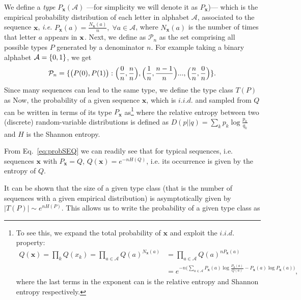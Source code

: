 We define a \textit{type} $P_\mathbf{x}(\mathcal{A})$ ---for simplicity we will denote it as $P_\mathbf{x}$)--- which is the empirical probability distribution of each letter in alphabet $\mathcal{A}$, associated to the sequence $\mathbf{x}$, \textit{i.e.} $P_\mathbf{x}(a) = \frac{N_\mathbf{x}(a)}{n},\; \forall a \in \mathcal{A}$, where $N_\mathbf{x}(a)$ is the number of times that letter $a$ appears in $\mathbf{x}$.
Next, we define as $\mathcal{P}_n$ as the set comprising all possible types $P$ generated by a denominator $n$. %
For example taking a binary alphabet $\mathcal{A} = \lbrace 0,1\rbrace$, we get
\begin{equation*}
\mathcal{P}_n = \lbrace \big(P(0), P(1)\big): \Big(\frac{0}{n},\frac{n}{n} \Big), \Big(\frac{1}{n},\frac{n-1}{n}\Big) ... ,\Big(\frac{n}{n}, \frac{0}{n}\Big)\rbrace.
\end{equation*}
Since many sequences can lead to the same type, we define the type class $T(P)$ as
Now, the probability of a given sequence $\mathbf{x}$, which is $i.i.d.$ and sampled from $Q$ can be written in terms of its type $P_\mathbf{x}$ as\footnote{To see this, we expand the total probability of $\mathbf{x}$ and exploit the $i.i.d.$ property:
\begin{align*}
Q(\mathbf{x}) = \prod_k Q(x_k) =\prod_{a\in\mathcal{A}}Q(a)^{N_\mathbf{x}(a)} &= \prod_{a\in \mathcal{A}}Q(a)^{n P_\mathbf{x}(a)} \\
&= e^{-n \Big(\sum_{a\in\mathcal{A}} P_\mathbf{x}(a) \log{\frac{P_\mathbf{x}(a)}{Q(a)} - P_\mathbf{x}(a) \log{P_\mathbf{x}(a)}}\Big)},
\end{align*}
where the last terms in the exponent can is the relative entropy and Shannon entropy respectively.}
where the relative entropy between two (discrete) random-variable distributions is defined as $D(p||q)=\sum_k p_k \log{\frac{p_k}{q_k}}$ and $H$ is the Shannon entropy.%

From Eq.~\ref{eq:probSEQ} we can readily see that for typical sequences, i.e. sequences
$\mathbf{x}$ with  $P_\mathbf{x}=Q$, $Q(\mathbf{x}) = e^{-n H(Q)}$, i.e. its occurrence is given by the entropy of $Q$.

It can be shown that the size of a given type class (that is the number of sequences with a given empirical distribution) is asymptotically given by $|T(P)|\sim e^{n H(P)}$. This allows us to write the probability of a given type class as

